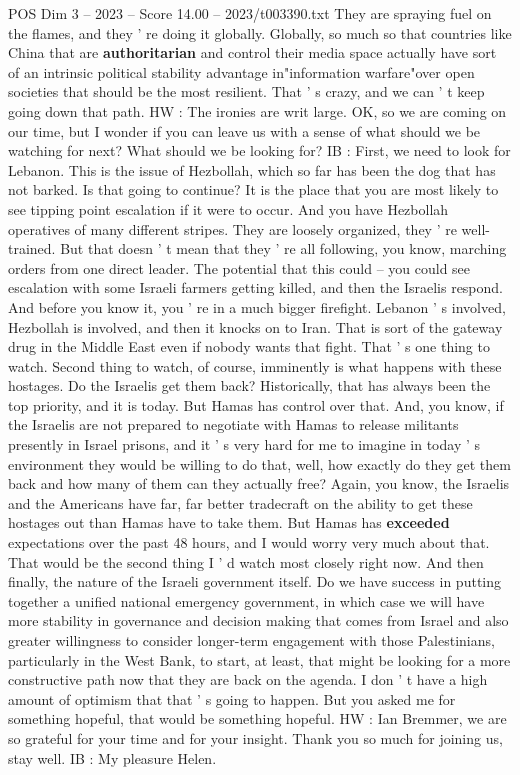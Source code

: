 \begin{textsample}{POS Dim 3 – 2023 – Score 14.00 – 2023/t003390.txt}
They are spraying fuel on the flames, and they ' re doing it globally.
Globally, so much so that countries like China that are \textbf{authoritarian} and control their media space actually have sort of an intrinsic political stability advantage in"information warfare"over open societies that should be the most resilient.
That ' s crazy, and we can ' t keep going down that path.
HW : The ironies are writ large.
OK, so we are coming on our time, but I wonder if you can leave us with a sense of what should we be watching for next?
What should we be looking for?
IB : First, we need to look for Lebanon.
This is the issue of Hezbollah, which so far has been the dog that has not barked.
Is that going to continue?
It is the place that you are most likely to see tipping point escalation if it were to occur.
And you have Hezbollah operatives of many different stripes.
They are loosely organized, they ' re well-trained.
But that doesn ' t mean that they ' re all following, you know, marching orders from one direct leader.
The potential that this could -- you could see escalation with some Israeli farmers getting killed, and then the Israelis respond.
And before you know it, you ' re in a much bigger firefight.
Lebanon ' s involved, Hezbollah is involved, and then it knocks on to Iran.
That is sort of the gateway drug in the Middle East even if nobody wants that fight.
That ' s one thing to watch.
Second thing to watch, of course, imminently is what happens with these hostages.
Do the Israelis get them back?
Historically, that has always been the top priority, and it is today.
But Hamas has control over that.
And, you know, if the Israelis are not prepared to negotiate with Hamas to release militants presently in Israel prisons, and it ' s very hard for me to imagine in today ' s environment they would be willing to do that, well, how exactly do they get them back and how many of them can they actually free?
Again, you know, the Israelis and the Americans have far, far better tradecraft on the ability to get these hostages out than Hamas have to take them.
But Hamas has \textbf{exceeded} expectations over the past 48 hours, and I would worry very much about that.
That would be the second thing I ' d watch most closely right now.
And then finally, the nature of the Israeli government itself.
Do we have success in putting together a unified national emergency government, in which case we will have more stability in governance and decision making that comes from Israel and also greater willingness to consider longer-term engagement with those Palestinians, particularly in the West Bank, to start, at least, that might be looking for a more constructive path now that they are back on the agenda.
I don ' t have a high amount of optimism that that ' s going to happen.
But you asked me for something hopeful, that would be something hopeful.
HW : Ian Bremmer, we are so grateful for your time and for your insight.
Thank you so much for joining us, stay well.
IB : My pleasure Helen.

\end{textsample}
